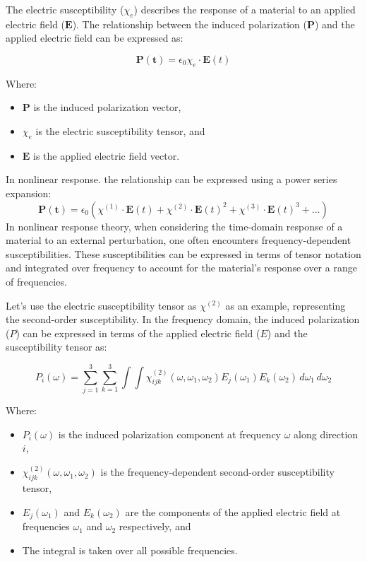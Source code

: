 The electric susceptibility ($\chi_e$) describes the response of a material to an applied electric field ($\mathbf{E}$). The relationship between the induced polarization ($\mathbf{P}$) and the applied electric field can be expressed as:

\[
	\mathbf{P(t)} =\epsilon_0 \chi_e \cdot \mathbf{E}(t)
\]

Where:
\begin{itemize}
	\item $\mathbf{P}$ is the induced polarization vector,
	\item $\chi_e$ is the electric susceptibility tensor, and
	\item $\mathbf{E}$ is the applied electric field vector.
\end{itemize}

In nonlinear response. the relationship can be expressed using a power series expansion:
\[
	\mathbf{P(t)} =\epsilon_0( \chi^{(1)} \cdot \mathbf{E}(t)+\chi^{(2)} \cdot \mathbf{E}(t)^2 + \chi^{(3)}
	\cdot \mathbf{E}(t)^3 + ...)
\]
In nonlinear response theory, when considering the time-domain response of a material to an external perturbation, one often encounters frequency-dependent susceptibilities. These susceptibilities can be expressed in terms of tensor notation and integrated over frequency to account for the material's response over a range of frequencies.

Let's use the electric susceptibility tensor as $\chi^{(2)}$ as an example, representing the second-order susceptibility. In the frequency domain, the induced polarization ($P$) can be expressed in terms of the applied electric field ($E$) and the susceptibility tensor as:

\[
	P_i(\omega) =  \sum_{j=1}^{3} \sum_{k=1}^{3}\int\int \chi^{(2)}_{ijk}(\omega, \omega_1, \omega_2) E_j(\omega_1) E_k(\omega_2) \, d\omega_1 \, d\omega_2
\]

Where:
\begin{itemize}
	\item $P_i(\omega)$ is the induced polarization component at frequency $\omega$ along direction
	      $i$,
	\item $\chi^{(2)}_{ijk}(\omega, \omega_1, \omega_2)$ is the frequency-dependent second-order susceptibility tensor,
	\item $E_j(\omega_1)$ and $E_k(\omega_2)$ are the components of the applied electric field at frequencies $\omega_1$ and $\omega_2$ respectively, and
	\item The integral is taken over all possible frequencies.
\end{itemize}

